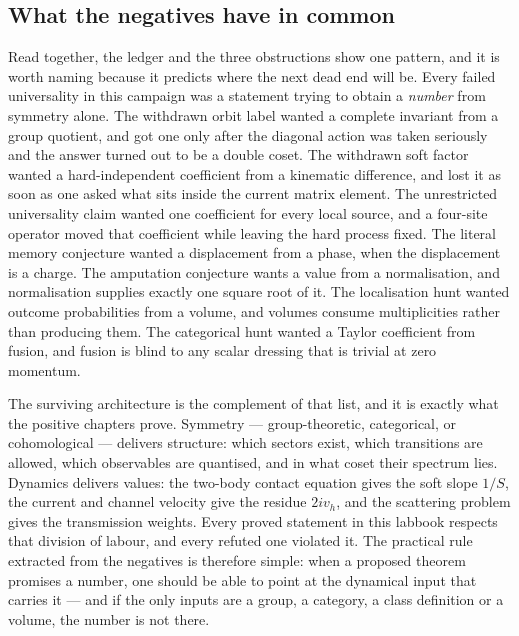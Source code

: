 \subsection{What the negatives have in common}
\label{sub:negative-synthesis}

Read together, the ledger and the three obstructions show one pattern, and it
is worth naming because it predicts where the next dead end will be. Every
failed universality in this campaign was a statement trying to obtain a
\emph{number} from symmetry alone. The withdrawn orbit label wanted a complete
invariant from a group quotient, and got one only after the diagonal action was
taken seriously and the answer turned out to be a double coset. The withdrawn
soft factor wanted a hard-independent coefficient from a kinematic difference,
and lost it as soon as one asked what sits inside the current matrix element.
The unrestricted universality claim wanted one coefficient for every local
source, and a four-site operator moved that coefficient while leaving the hard
process fixed. The literal memory conjecture wanted a displacement from a
phase, when the displacement is a charge. The amputation conjecture wants a
value from a normalisation, and normalisation supplies exactly one square root
of it. The localisation hunt wanted outcome probabilities from a volume, and
volumes consume multiplicities rather than producing them. The categorical hunt
wanted a Taylor coefficient from fusion, and fusion is blind to any scalar
dressing that is trivial at zero momentum.

The surviving architecture is the complement of that list, and it is exactly
what the positive chapters prove. Symmetry — group-theoretic, categorical, or
cohomological — delivers structure: which sectors exist, which transitions are
allowed, which observables are quantised, and in what coset their spectrum
lies. Dynamics delivers values: the two-body contact equation gives the soft
slope $1/S$, the current and channel velocity give the residue $2iv_h$, and the
scattering problem gives the transmission weights. Every proved statement in
this labbook respects that division of labour, and every refuted one violated
it. The practical rule extracted from the negatives is therefore simple: when a
proposed theorem promises a number, one should be able to point at the
dynamical input that carries it — and if the only inputs are a group, a
category, a class definition or a volume, the number is not there.
